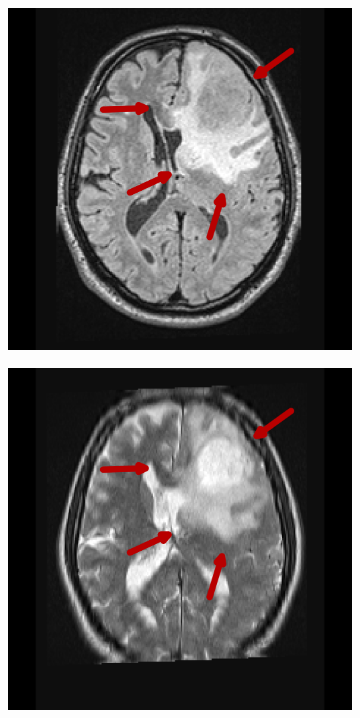 \begin{figure}[hbt]
    \begin{subfigure}[b]{0.45\textwidth}
        \centering
        \includegraphics[width=\textwidth]{Figures/FLAIR_arrows.png}
        \caption{}\label{fig:intro_FLAIR}
    \end{subfigure}
    \begin{subfigure}[b]{0.45\textwidth}
        \centering
        \includegraphics[width=\textwidth]{Figures/T2_arrows.png}
        \caption{}\label{fig:intro_T2}
    \end{subfigure}


\end{figure}

